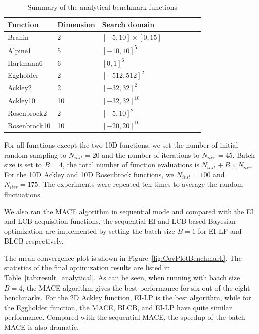 \begin{table}[htbp]
    \centering
    \caption{Summary of the analytical benchmark functions}
    \label{tab:summaryanalygical}
    \begin{tabular}{llllllll}
        \toprule
         Function           & Dimension        & Search domain             \\ \midrule
         Branin             & 2                & $[-5,  10]\times[0, 15]$  \\
         Alpine1            & 5                & $[-10, 10]^5$             \\
         Hartmann6          & 6                & $[0,   1]^6$              \\
         Eggholder          & 2                & $[-512, 512]^2$           \\
         Ackley2            & 2                & $[-32, 32]^2$             \\
         Ackley10           & 10               & $[-32, 32]^{10}$          \\
         Rosenbrock2        & 2                & $[-5,  10]^2$             \\
         Rosenbrock10       & 10               & $[-20, 20]^{10}$          \\
        \bottomrule
    \end{tabular}
\end{table}

For all functions except the two 10D functions, we set the number of initial
random sampling to $N_{init} = 20$ and the number of iterations to $N_{iter} =
45$. Batch size is set to $B = 4$, the total number of function evaluations is
$N_{init} + B \times N_{iter}$. For the 10D Ackley and 10D Rosenbrock functions, we
$N_{init} = 100$ and $N_{iter} = 175$. The experiments were repeated ten
times to average the random fluctuations.

We also ran the MACE algorithm in sequential mode and compared with the EI and LCB
acquisition functions, the sequential EI and LCB based Bayesian optimization
are implemented by setting the batch size $B = 1$ for EI-LP and BLCB
respectively.

The mean convergence plot is shown in Figure~\ref{fig:CovPlotBenchmark}. The
statistics of the final optimization results are listed in
Table~\ref{tab:result_analytical}. As can be seen, when running with batch size
$B = 4$, the MACE algorithm gives the best performance for six out of the eight
benchmarks.  For the 2D Ackley function, EI-LP is the best algorithm, while for
the Eggholder function, the MACE, BLCB, and EI-LP have quite similar
performance.  Compared with the sequential MACE, the speedup of the batch MACE is
also dramatic.

